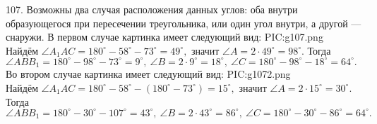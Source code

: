 107. Возможны два случая расположения данных углов: оба внутри образующегося при пересечении треугольника, или один угол внутри, а другой --- снаружи. В первом случае картинка имеет следующий вид:
{{PIC:g107.png}}\\
Найдём $\angle A_1AC=180^\circ-58^\circ-73^\circ=49^\circ,$ значит $\angle A=2\cdot49^\circ=98^\circ.$ Тогда $\angle ABB_1=180^\circ-98^\circ-73^\circ=9^\circ,\ \angle B=2\cdot9^\circ=18^\circ,\ \angle C=180^\circ-98^\circ-18^\circ=64^\circ.$\\
Во втором случае картинка имеет следующий вид:
{{PIC:g1072.png}}\\
Найдём $\angle A_1AC=180^\circ-58^\circ-(180^\circ-73^\circ)=15^\circ,$ значит $\angle A=2\cdot15^\circ=30^\circ.$ Тогда $\angle ABB_1=180^\circ-30^\circ-107^\circ=43^\circ,\ \angle B=2\cdot43^\circ=86^\circ,\ \angle C=180^\circ-30^\circ-86^\circ=64^\circ.$\\

